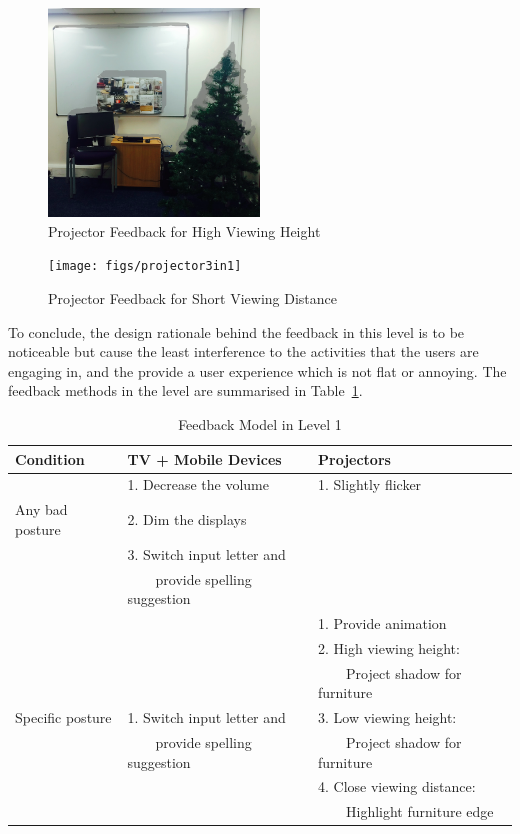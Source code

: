 \begin{figure}[h]
\centering
  \includegraphics[width=0.5\textwidth]{figs/projector2in1}
\caption{Projector Feedback for High Viewing Height}
\label{fig:hvh}
\end{figure}

\begin{figure}[h]
\centering
  \texttt{[image: figs/projector3in1]}
\caption{Projector Feedback for Short Viewing Distance}
\label{fig:svd}
\end{figure}

To conclude, the design rationale behind the feedback in this level is to be noticeable but cause the least interference to the activities that the users are engaging in, and the provide a user experience which is not flat or annoying. The feedback methods in the level are summarised in Table~\ref{tab:feedback_model_lvl1}.

\begin{table}[h]
\centering
\begin{tabular}{l l l} 
\hline\hline
 Condition & TV + Mobile Devices & Projectors\\
\hline\hline
 &1. Decrease the volume & 1. Slightly flicker\\
Any bad posture &2. Dim the displays & \\
&3. Switch input letter and & \\
 & \ \ \ \ provide spelling suggestion & \\
\hline
 &  & 1. Provide animation \\
 & &2. High viewing height: \\
 && \ \ \ \ Project shadow for furniture\\
Specific posture&1. Switch input letter and & 3. Low viewing height:\\
  & \ \ \ \ provide spelling suggestion& \ \ \ \ Project shadow for furniture\\
  & & 4. Close viewing distance:\\
  & &\ \ \ \ Highlight furniture edge\\
\hline\hline
\end{tabular}
\caption{Feedback Model in Level 1}
\label{tab:feedback_model_lvl1}
\end{table}

